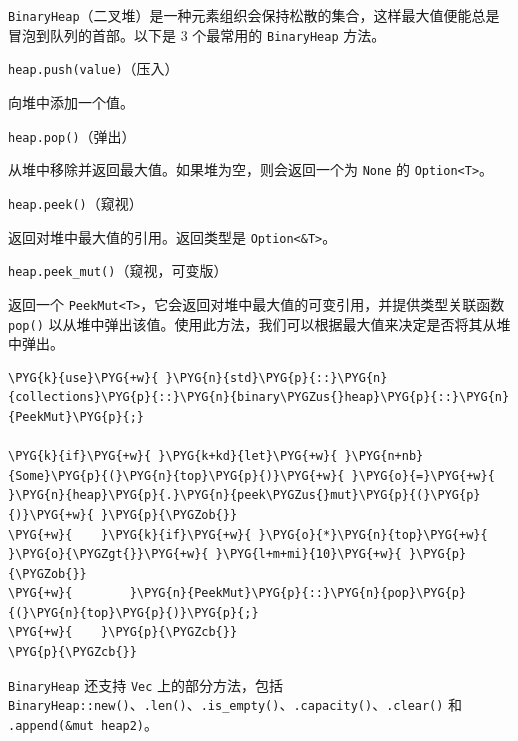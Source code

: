 \texttt{BinaryHeap}（二叉堆）是一种元素组织会保持松散的集合，这样最大值便能总是冒泡到队列的首部。以下是 3 个最常用的 \texttt{BinaryHeap} 方法。

\begin{mySidenote}
\texttt{heap.push(value)}（压入）
\end{mySidenote}

向堆中添加一个值。

\begin{mySidenote}
\texttt{heap.pop()}（弹出）
\end{mySidenote}

从堆中移除并返回最大值。如果堆为空，则会返回一个为 \texttt{None} 的 \texttt{Option<T>}。

\begin{mySidenote}
\texttt{heap.peek()}（窥视）
\end{mySidenote}

返回对堆中最大值的引用。返回类型是 \texttt{Option<\&T>}。

\begin{mySidenote}
\texttt{heap.peek\_mut()}（窥视，可变版）
\end{mySidenote}

返回一个 \texttt{PeekMut<T>}，它会返回对堆中最大值的可变引用，并提供类型关联函数 \texttt{pop()} 以从堆中弹出该值。使用此方法，我们可以根据最大值来决定是否将其从堆中弹出。

\begin{Verbatim}[commandchars=\\\{\},breaklines=true,breakanywhere=true,fontsize=\codefont,xleftmargin=17bp]
\PYG{k}{use}\PYG{+w}{ }\PYG{n}{std}\PYG{p}{::}\PYG{n}{collections}\PYG{p}{::}\PYG{n}{binary\PYGZus{}heap}\PYG{p}{::}\PYG{n}{PeekMut}\PYG{p}{;}

\PYG{k}{if}\PYG{+w}{ }\PYG{k+kd}{let}\PYG{+w}{ }\PYG{n+nb}{Some}\PYG{p}{(}\PYG{n}{top}\PYG{p}{)}\PYG{+w}{ }\PYG{o}{=}\PYG{+w}{ }\PYG{n}{heap}\PYG{p}{.}\PYG{n}{peek\PYGZus{}mut}\PYG{p}{(}\PYG{p}{)}\PYG{+w}{ }\PYG{p}{\PYGZob{}}
\PYG{+w}{    }\PYG{k}{if}\PYG{+w}{ }\PYG{o}{*}\PYG{n}{top}\PYG{+w}{ }\PYG{o}{\PYGZgt{}}\PYG{+w}{ }\PYG{l+m+mi}{10}\PYG{+w}{ }\PYG{p}{\PYGZob{}}
\PYG{+w}{        }\PYG{n}{PeekMut}\PYG{p}{::}\PYG{n}{pop}\PYG{p}{(}\PYG{n}{top}\PYG{p}{)}\PYG{p}{;}
\PYG{+w}{    }\PYG{p}{\PYGZcb{}}
\PYG{p}{\PYGZcb{}}
\end{Verbatim}

\texttt{BinaryHeap} 还支持 \texttt{Vec} 上的部分方法，包括 \texttt{BinaryHeap::new()}、\texttt{.len()}、\texttt{.is\_empty()}、\texttt{.capacity()}、\texttt{.clear()} 和 \texttt{.append(\&mut heap2)}。

